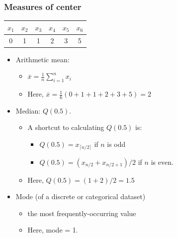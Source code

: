\documentclass{beamer}
\providecommand{\ov}[1]{\overline{#1}}
\numberwithin{equation}{section}
\begin{document}
\begin{frame}
\frametitle{Measures of center}

\begin{center}
\begin{tabular}{cccccc}
$x_1$ & $x_2$ & $x_3$& $x_4$ & $x_5$ & $x_6$  \\ \hline
0 & 1 & 1 & 2 & 3 & 5
\end{tabular}
\end{center}

\begin{itemize}
\pause \item Arithmetic mean:
\begin{itemize}
\pause \item $\ov{x} = \frac{1}{n} \sum_{i = 1}^n x_i$
\pause \item Here, $\ov{x} = \frac{1}{6} (0+1+1+2+3+5) = 2$
\end{itemize}
\pause \item Median: $Q(0.5)$. 
\begin{itemize}
\pause \item A shortcut to calculating $Q(0.5)$ is:
\begin{itemize}
\pause \item $Q(0.5) = x_{\lceil n/2 \rceil}$ if $n$ is odd
\pause \item $Q(0.5) = (x_{n/2} + x_{n/2 + 1}) / 2$ if $n$ is even.
\end{itemize}
\pause \item Here, $Q(0.5) = (1 + 2)/2 = 1.5$
\end{itemize}
\pause \item Mode (of a discrete or categorical dataset)
\begin{itemize}
\pause \item the most frequently-occurring value
\pause \item Here, mode = 1.
\end{itemize}
\end{itemize}
\end{frame}
\end{document}
